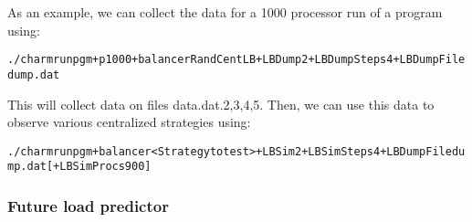 As an example, we can collect the data for a 1000 processor run of a program using:
\begin{alltt}
./charmrun pgm +p 1000 +balancer RandCentLB +LBDump 2 +LBDumpSteps 4 +LBDumpFile dump.dat
\end{alltt}
This will collect data on files data.dat.{2,3,4,5}. Then, we can use this data to observe various centralized strategies using:
\begin{alltt}
./charmrun pgm +balancer <Strategy to test> +LBSim 2 +LBSimSteps 4 +LBDumpFile dump.dat [+LBSimProcs 900]
\end{alltt}

\subsubsection{Future load predictor}

